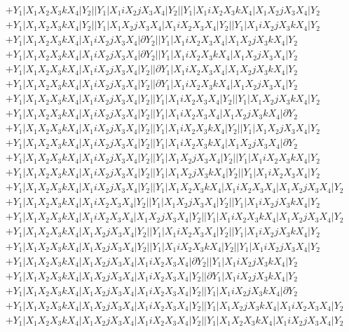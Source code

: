 \documentclass{article}[12pt]
\begin{document}
\begin{align*}
 & +Y_1|X_1X_2X_3kX_4|Y_2||Y_1|X_1iX_2jX_3X_4|Y_2||Y_1|X_1iX_2X_3kX_4|X_1X_2jX_3X_4|Y_2\\ 
 & +Y_1|X_1X_2X_3kX_4|Y_2||Y_1|X_1X_2jX_3X_4|X_1iX_2X_3X_4|Y_2||Y_1|X_1iX_2jX_3kX_4|Y_2\\ 
 & +Y_1|X_1X_2X_3kX_4|X_1iX_2jX_3X_4|\partial Y_2||Y_1|X_1iX_2X_3X_4|X_1X_2jX_3kX_4|Y_2\\ 
 & +Y_1|X_1X_2X_3kX_4|X_1iX_2jX_3X_4|\partial Y_2||Y_1|X_1iX_2X_3kX_4|X_1X_2jX_3X_4|Y_2\\ 
 & +Y_1|X_1X_2X_3kX_4|X_1iX_2jX_3X_4|Y_2||\partial Y_1|X_1iX_2X_3X_4|X_1X_2jX_3kX_4|Y_2\\ 
 & +Y_1|X_1X_2X_3kX_4|X_1iX_2jX_3X_4|Y_2||\partial Y_1|X_1iX_2X_3kX_4|X_1X_2jX_3X_4|Y_2\\ 
 & +Y_1|X_1X_2X_3kX_4|X_1iX_2jX_3X_4|Y_2||Y_1|X_1iX_2X_3X_4|Y_2||Y_1|X_1X_2jX_3kX_4|Y_2\\ 
 & +Y_1|X_1X_2X_3kX_4|X_1iX_2jX_3X_4|Y_2||Y_1|X_1iX_2X_3X_4|X_1X_2jX_3kX_4|\partial Y_2\\ 
 & +Y_1|X_1X_2X_3kX_4|X_1iX_2jX_3X_4|Y_2||Y_1|X_1iX_2X_3kX_4|Y_2||Y_1|X_1X_2jX_3X_4|Y_2\\ 
 & +Y_1|X_1X_2X_3kX_4|X_1iX_2jX_3X_4|Y_2||Y_1|X_1iX_2X_3kX_4|X_1X_2jX_3X_4|\partial Y_2\\ 
 & +Y_1|X_1X_2X_3kX_4|X_1iX_2jX_3X_4|Y_2||Y_1|X_1X_2jX_3X_4|Y_2||Y_1|X_1iX_2X_3kX_4|Y_2\\ 
 & +Y_1|X_1X_2X_3kX_4|X_1iX_2jX_3X_4|Y_2||Y_1|X_1X_2jX_3kX_4|Y_2||Y_1|X_1iX_2X_3X_4|Y_2\\ 
 & +Y_1|X_1X_2X_3kX_4|X_1iX_2jX_3X_4|Y_2||Y_1|X_1X_2X_3kX_4|X_1iX_2X_3X_4|X_1X_2jX_3X_4|Y_2\\ 
 & +Y_1|X_1X_2X_3kX_4|X_1iX_2X_3X_4|Y_2||Y_1|X_1X_2jX_3X_4|Y_2||Y_1|X_1iX_2jX_3kX_4|Y_2\\ 
 & +Y_1|X_1X_2X_3kX_4|X_1iX_2X_3X_4|X_1X_2jX_3X_4|Y_2||Y_1|X_1iX_2X_3kX_4|X_1X_2jX_3X_4|Y_2\\ 
 & +Y_1|X_1X_2X_3kX_4|X_1X_2jX_3X_4|Y_2||Y_1|X_1iX_2X_3X_4|Y_2||Y_1|X_1iX_2jX_3kX_4|Y_2\\ 
 & +Y_1|X_1X_2X_3kX_4|X_1X_2jX_3X_4|Y_2||Y_1|X_1iX_2X_3kX_4|Y_2||Y_1|X_1iX_2jX_3X_4|Y_2\\ 
 & +Y_1|X_1X_2X_3kX_4|X_1X_2jX_3X_4|X_1iX_2X_3X_4|\partial Y_2||Y_1|X_1iX_2jX_3kX_4|Y_2\\ 
 & +Y_1|X_1X_2X_3kX_4|X_1X_2jX_3X_4|X_1iX_2X_3X_4|Y_2||\partial Y_1|X_1iX_2jX_3kX_4|Y_2\\ 
 & +Y_1|X_1X_2X_3kX_4|X_1X_2jX_3X_4|X_1iX_2X_3X_4|Y_2||Y_1|X_1iX_2jX_3kX_4|\partial Y_2\\ 
 & +Y_1|X_1X_2X_3kX_4|X_1X_2jX_3X_4|X_1iX_2X_3X_4|Y_2||Y_1|X_1X_2jX_3kX_4|X_1iX_2X_3X_4|Y_2\\ 
 & +Y_1|X_1X_2X_3kX_4|X_1X_2jX_3X_4|X_1iX_2X_3X_4|Y_2||Y_1|X_1X_2X_3kX_4|X_1iX_2jX_3X_4|Y_2\end{align*}
\end{document}
